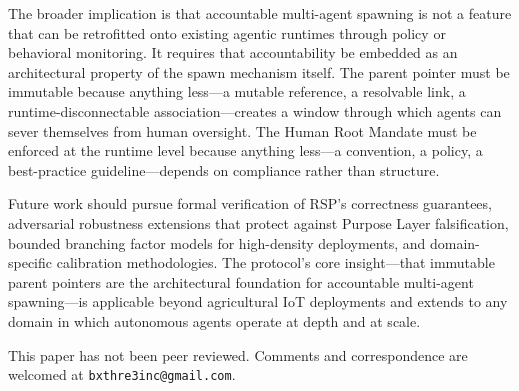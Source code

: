 The broader implication is that accountable multi-agent spawning is not a feature that can be retrofitted onto existing agentic runtimes through policy or behavioral monitoring. It requires that accountability be embedded as an architectural property of the spawn mechanism itself. The parent pointer must be immutable because anything less---a mutable reference, a resolvable link, a runtime-disconnectable association---creates a window through which agents can sever themselves from human oversight. The Human Root Mandate must be enforced at the runtime level because anything less---a convention, a policy, a best-practice guideline---depends on compliance rather than structure.

Future work should pursue formal verification of RSP's correctness guarantees, adversarial robustness extensions that protect against Purpose Layer falsification, bounded branching factor models for high-density deployments, and domain-specific calibration methodologies. The protocol's core insight---that immutable parent pointers are the architectural foundation for accountable multi-agent spawning---is applicable beyond agricultural IoT deployments and extends to any domain in which autonomous agents operate at depth and at scale.

This paper has not been peer reviewed. Comments and correspondence are welcomed at \texttt{bxthre3inc@gmail.com}.


